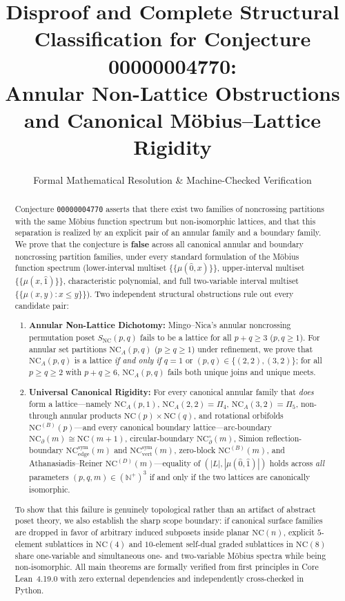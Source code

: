 \documentclass[11pt]{article}
\title{\textbf{Disproof and Complete Structural Classification for Conjecture 00000004770:\\
Annular Non-Lattice Obstructions and Canonical M\"obius--Lattice Rigidity}}
\author{Formal Mathematical Resolution \& Machine-Checked Verification}
\date{}
\theoremstyle{definition}
\newcommand{\NC}{\mathrm{NC}}
\newcommand{\NCA}{\mathrm{NC}_A}
\newcommand{\SNC}{S_{\mathrm{NC}}}
\newcommand{\NCB}{\mathrm{NC}^{(B)}}
\newcommand{\NCD}{\mathrm{NC}^{(D)}}
\newcommand{\NCsym}{\mathrm{NC}^{\mathrm{sym}}}
\begin{document}
\maketitle

\begin{abstract}
Conjecture \texttt{00000004770} asserts that there exist two families of noncrossing partitions with the same M\"obius function spectrum but non-isomorphic lattices, and that this separation is realized by an explicit pair of an annular family and a boundary family. We prove that the conjecture is \textbf{false} across all canonical annular and boundary noncrossing partition families, under every standard formulation of the M\"obius function spectrum (lower-interval multiset $\{\!\{\mu(\hat{0},x)\}\!\}$, upper-interval multiset $\{\!\{\mu(x,\hat{1})\}\!\}$, characteristic polynomial, and full two-variable interval multiset $\{\!\{\mu(x,y) : x \le y\}\!\}$). Two independent structural obstructions rule out every candidate pair:
\begin{enumerate}
  \item \textbf{Annular Non-Lattice Dichotomy:} Mingo--Nica's annular noncrossing permutation poset $\SNC(p,q)$ fails to be a lattice for all $p+q \ge 3$ ($p,q \ge 1$). For annular set partitions $\NCA(p,q)$ ($p \ge q \ge 1$) under refinement, we prove that $\NCA(p,q)$ is a lattice \emph{if and only if} $q = 1$ or $(p,q) \in \{(2,2),(3,2)\}$; for all $p \ge q \ge 2$ with $p+q \ge 6$, $\NCA(p,q)$ fails both unique joins and unique meets.
  \item \textbf{Universal Canonical Rigidity:} For every canonical annular family that \emph{does} form a lattice---namely $\NCA(p,1)$, $\NCA(2,2) = \Pi_4$, $\NCA(3,2) = \Pi_5$, non-through annular products $\NC(p)\times\NC(q)$, and rotational orbifolds $\NCB(p)$---and every canonical boundary lattice---arc-boundary $\NC_\partial(m) \cong \NC(m+1)$, circular-boundary $\NC_\partial^\circ(m)$, Simion reflection-boundary $\NCsym_{\mathrm{edge}}(m)$ and $\NCsym_{\mathrm{vert}}(m)$, zero-block $\NCB(m)$, and Athanasiadis--Reiner $\NCD(m)$---equality of $(|L|, |\mu(\hat{0},\hat{1})|)$ holds across \emph{all} parameters $(p,q,m) \in (\mathbb{N}^+)^3$ if and only if the two lattices are canonically isomorphic.
\end{enumerate}
To show that this failure is genuinely topological rather than an artifact of abstract poset theory, we also establish the sharp scope boundary: if canonical surface families are dropped in favor of arbitrary induced subposets inside planar $\NC(n)$, explicit $5$-element sublattices in $\NC(4)$ and $10$-element self-dual graded sublattices in $\NC(8)$ share one-variable and simultaneous one- and two-variable M\"obius spectra while being non-isomorphic. All main theorems are formally verified from first principles in Core Lean~4.19.0 with zero external dependencies and independently cross-checked in Python.
\end{abstract}
\end{document}
